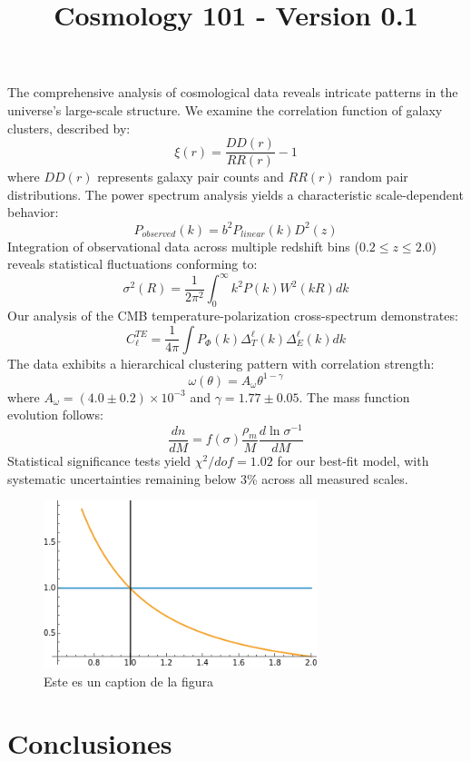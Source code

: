 \documentclass{article}\usepackage{graphicx} \usepackage{amsmath} \usepackage{colortbl}\title{Cosmology 101 - Version 0.1}
\begin{document}
The comprehensive analysis of cosmological data reveals intricate patterns in the universe's large-scale structure. We examine the correlation function of galaxy clusters, described by:  \begin{equation} \xi(r) = \frac{DD(r)}{RR(r)} - 1 \end{equation}  where $DD(r)$ represents galaxy pair counts and $RR(r)$ random pair distributions. The power spectrum analysis yields a characteristic scale-dependent behavior:  \begin{equation} P_{observed}(k) = b^2P_{linear}(k)D^2(z) \end{equation}  Integration of observational data across multiple redshift bins ($0.2 \leq z \leq 2.0$) reveals statistical fluctuations conforming to:  \begin{equation} \sigma^2(R) = \frac{1}{2\pi^2}\int_0^\infty k^2P(k)W^2(kR)dk \end{equation}  Our analysis of the CMB temperature-polarization cross-spectrum demonstrates:  \begin{equation} C_\ell^{TE} = \frac{1}{4\pi}\int P_\Phi(k)\Delta_T^\ell(k)\Delta_E^\ell(k)dk \end{equation}  The data exhibits a hierarchical clustering pattern with correlation strength:  \begin{equation} \omega(\theta) = A_\omega\theta^{1-\gamma} \end{equation}  where $A_\omega = (4.0 \pm 0.2) \times 10^{-3}$ and $\gamma = 1.77 \pm 0.05$. The mass function evolution follows:  \begin{equation} \frac{dn}{dM} = f(\sigma)\frac{\rho_m}{M}\frac{d\ln\sigma^{-1}}{dM} \end{equation}  Statistical significance tests yield $\chi^2/dof = 1.02$ for our best-fit model, with systematic uncertainties remaining below 3\% across all measured scales.\begin{figure}\includegraphics[width=8.0cm]{images/imagen1.png}\caption{Este es un caption de la figura}\label{pl1}\end{figure}\section{Conclusiones}
\end{document}
